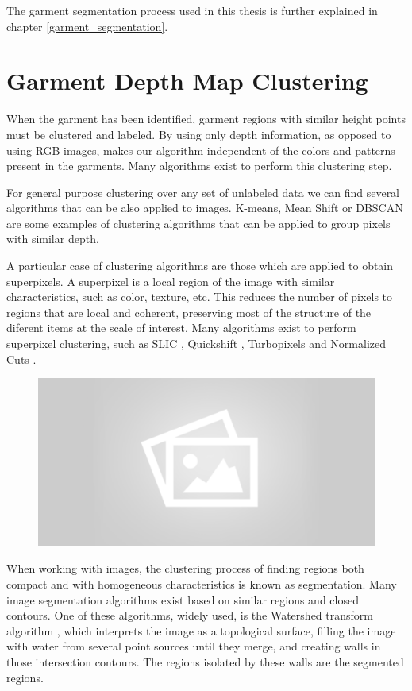 The garment segmentation process used in this thesis is further explained in chapter \ref{garment_segmentation}.

\section{Garment Depth Map Clustering}
\label{architecture:depth_map_clustering}
When the garment has been identified, garment regions with similar height points must be clustered and labeled. By using only depth information, as opposed to using RGB images, makes our algorithm independent of the colors and patterns present in the garments. Many algorithms exist to perform this clustering step.

For general purpose clustering over any set of unlabeled data we can find several algorithms that can be also applied to images. K-means, Mean Shift  or DBSCAN  are some examples of clustering algorithms that can be applied to group pixels with similar depth.

A particular case of clustering algorithms are those which are applied to obtain superpixels. A superpixel  is a local region of the image with similar characteristics, such as color, texture, etc. This reduces the number of pixels to regions that are local and coherent, preserving most of the structure of the diferent items at the scale of interest. Many algorithms exist to perform superpixel clustering, such as SLIC , Quickshift , Turbopixels  and Normalized Cuts .

\begin{figure}[thpb]
    \centering
    \includegraphics[width=0.8
    \textwidth]{figures/placeholder2.png}
    \caption{}
    \label{fig:generic_superpixels}
\end{figure}

When working with images, the clustering process of finding regions both compact and with homogeneous characteristics is known as segmentation. Many image segmentation algorithms exist based on similar regions and closed contours. One of these algorithms, widely used, is the Watershed transform algorithm , which interprets the image as a topological surface, filling the image with water from several point sources until they merge, and creating walls in those intersection contours. The regions isolated by these walls are the segmented regions.

